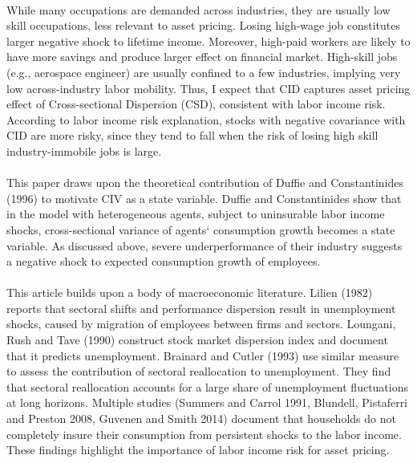 \documentclass[12pt]{article}
\begin{document}
\paragraph{}
While many occupations are demanded across industries, they are usually low skill occupations, less relevant to asset pricing. Losing high-wage job constitutes larger negative shock to lifetime income. Moreover, high-paid workers are likely to have more savings and produce larger effect on financial market. High-skill jobs (e.g., aerospace engineer) are usually confined to a few industries, implying very low across-industry labor mobility. Thus, I expect that CID captures asset pricing effect of Cross-sectional Dispersion (CSD), consistent with labor income risk. According to labor income risk explanation, stocks with negative covariance with CID are more risky, since they tend to fall when the risk of losing high skill industry-immobile jobs is large.
\paragraph{}
This paper draws upon the theoretical contribution of Duffie and Constantinides (1996) to motivate CIV as a state variable. Duffie and Constantinides show that in the model with heterogeneous agents, subject to uninsurable labor income shocks, cross-sectional variance of agents` consumption growth becomes a state variable. As discussed above, severe underperformance of their industry suggests a negative shock to expected consumption growth of employees.
\paragraph{}
This article builds upon a body of macroeconomic literature. Lilien (1982) reports that sectoral shifts and performance dispersion result in unemployment shocks, caused by migration of employees between firms and sectors. Loungani, Rush and Tave (1990) construct stock market dispersion index and document that it predicts unemployment. Brainard and Cutler (1993) use similar measure to assess the contribution of sectoral reallocation to unemployment. They find that sectoral reallocation accounts for a large share of unemployment fluctuations at long horizons. Multiple studies (Summers and Carrol 1991, Blundell, Pistaferri and Preston 2008, Guvenen and Smith 2014) document that households do not completely insure their consumption from persistent shocks to the labor income. These findings highlight the importance of labor income risk for asset pricing.
\end{document}
